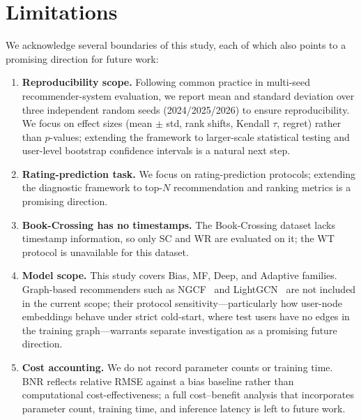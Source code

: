\documentclass[journal]{IEEEtran}
\begin{document}
\FloatBarrier
\section{Limitations}
\label{sec:limitations}

We acknowledge several boundaries of this study, each of which also points to a promising direction for future work:

\begin{enumerate}
    \item \textbf{Reproducibility scope.} Following common practice in multi-seed recommender-system evaluation, we report mean and standard deviation over three independent random seeds (2024/2025/2026) to ensure reproducibility. We focus on effect sizes (mean $\pm$ std, rank shifts, Kendall $\tau$, regret) rather than $p$-values; extending the framework to larger-scale statistical testing and user-level bootstrap confidence intervals is a natural next step.
    \item \textbf{Rating-prediction task.} We focus on rating-prediction protocols; extending the diagnostic framework to top-$N$ recommendation and ranking metrics is a promising direction.
    \item \textbf{Book-Crossing has no timestamps.} The Book-Crossing dataset lacks timestamp information, so only SC and WR are evaluated on it; the WT protocol is unavailable for this dataset.
    \item \textbf{Model scope.} This study covers Bias, MF, Deep, and Adaptive families. Graph-based recommenders such as NGCF~\cite{wang2019ngcf} and LightGCN~\cite{he2020lightgcn} are not included in the current scope; their protocol sensitivity---particularly how user-node embeddings behave under strict cold-start, where test users have no edges in the training graph---warrants separate investigation as a promising future direction.
    \item \textbf{Cost accounting.} We do not record parameter counts or training time. BNR reflects relative RMSE against a bias baseline rather than computational cost-effectiveness; a full cost--benefit analysis that incorporates parameter count, training time, and inference latency is left to future work.
\end{enumerate}
\end{document}
